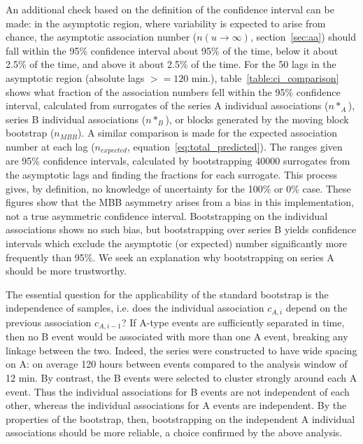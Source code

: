 \documentclass[letterpaper,11pt]{article}
\begin{document}
An additional check based on the definition of the confidence interval
can be made: in the asymptotic region, where variability is expected
to arise from chance, the asymptotic association number ($n(u\rightarrow\infty)$,
section~\ref{sec:aa}) should fall
within the 95\% confidence interval about 95\% of the time, below it
about 2.5\% of the time, and above it about 2.5\% of the time. For the
50 lags in the asymptotic region (absolute lags $>=120$ min.),
table~\ref{table:ci_comparison} shows what fraction of the association
numbers fell within the 95\% confidence interval, calculated from surrogates of the series A
individual associations ($n*_{A}$), series B individual associations
($n*_{B}$), or blocks generated by the moving block bootstrap
($n_{MBB}$). A similar comparison
is made for the expected association number at each lag
($n_{expected}$, equation~\ref{eq:total_predicted}). The ranges given are 95\%
confidence intervals, calculated by bootstrapping 40000 surrogates
from the asymptotic lags and finding the fractions for each
surrogate. This process gives, by definition, no knowledge of
uncertainty for the 100\% or 0\% case. These figures show that the MBB
asymmetry arises from a bias in this implementation, not a true
asymmetric confidence interval. Bootstrapping on the individual
associations shows no such bias, but bootstrapping over series B
yields confidence intervals which exclude the asymptotic (or expected)
number significantly more frequently than 95\%. We seek an explanation
why bootstrapping on series A should be more trustworthy.

The essential question for the applicability of the standard bootstrap
is the independence of samples, i.e. does the individual association
$c_{A,i}$ depend on the previous association $c_{A,i-1}$? If A-type
events are sufficiently separated in time, then no B event would be
associated with more than one A event, breaking any linkage between
the two. Indeed, the series were constructed to have wide spacing on
A: on average 120 hours between events compared to the analysis window
of 12 min. By contrast, the B events were selected to cluster
strongly around each A event. Thus the individual associations for B
events are not independent of each other, whereas the individual
associations for A events are independent. By the properties of the
bootstrap, then, bootstrapping on the independent A individual
associations should be more reliable, a choice confirmed by the above
analysis.
\end{document}
